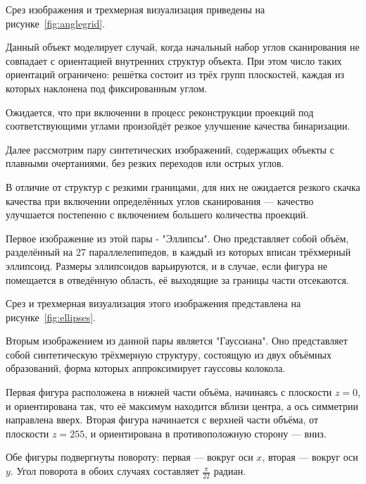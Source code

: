 Срез изображения и трехмерная визуализация приведены на рисунке~\ref{fig:anglegrid}.

Данный объект моделирует случай, когда начальный набор углов сканирования не совпадает с ориентацией внутренних структур объекта. При этом число таких ориентаций ограничено: решётка состоит из трёх групп плоскостей, каждая из которых наклонена под фиксированным углом.

Ожидается, что при включении в процесс реконструкции проекций под соответствующими углами произойдёт резкое улучшение качества бинаризации.


Далее рассмотрим пару синтетических изображений, содержащих объекты с плавными очертаниями, без резких переходов или острых углов.

В отличие от структур с резкими границами, для них не ожидается резкого скачка качества при включении определённых углов сканирования — качество улучшается постепенно с включением большего количества проекций.

Первое изображение из этой пары - "Эллипсы". Оно представляет собой объём, разделённый на 27 параллелепипедов, в каждый из которых вписан трёхмерный эллипсоид. Размеры эллипсоидов варьируются, и в случае, если фигура не помещается в отведённую область, её выходящие за границы части отсекаются.

Срез и трехмерная визуализация этого изображения представлена на рисунке~\ref{fig:ellipses}.


Вторым изображением из данной пары является "Гауссиана". Оно представляет собой синтетическую трёхмерную структуру, состоящую из двух объёмных образований, форма которых аппроксимирует гауссовы колокола.

Первая фигура расположена в нижней части объёма, начинаясь с плоскости \(z = 0\), и ориентирована так, что её максимум находится вблизи центра, а ось симметрии направлена вверх. Вторая фигура начинается с верхней части объёма, от плоскости \(z = 255\), и ориентирована в противоположную сторону — вниз.

Обе фигуры подвергнуты повороту: первая — вокруг оси \(x\), вторая — вокруг оси \(y\). Угол поворота в обоих случаях составляет \(\frac{\pi}{22}\) радиан.

